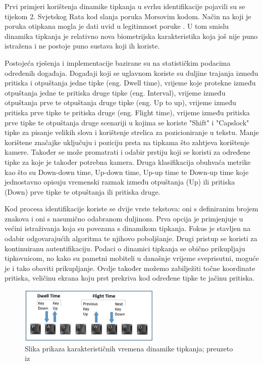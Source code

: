 \documentclass[]{foi}
\begin{document}
Prvi primjeri korištenja dinamike tipkanja u svrhu identifikacije pojavili su se tijekom 2. Svjetskog Rata kod slanja poruka Morsovim kodom. Način na koji je poruka otipkana mogla je dati uvid u legitimnost poruke \cite{Haring2007}. U tom smislu dinamika tipkanja je relativno nova biometrijska karakteristika koja još nije puno istražena i ne postoje puno sustava koji ih koriste. 

Postojeća rješenja i implementacije bazirane su na statističkim podacima određenih događaja. Događaji koji se uglavnom koriste su duljine trajanja između pritiska i otpuštanja jedne tipke (eng. Dwell time), vrijeme koje protekne između otpuštanja jedne te pritiska druge tipke (eng. Interval), vrijeme između otpuštanja prve te otpuštanja druge tipke (eng. Up to up), vrijeme između pritiska prve tipke te pritiska druge (eng. Flight time), vrijeme između pritiska prve tipke te otpuštanja druge scenariji u kojima se koriste "Shift" i "Capslock" tipke za pisanje velikih slova i korištenje strelica za pozicioniranje u tekstu.\cite{Kasprowski2022} Manje korištene značajke uključuju i poziciju prsta na tipkama što zahtjeva korištenje kamere. Također se može promatrati i odabir prstiju koji se koristi za određene tipke za koje je također potrebna kamera. Druga klasifikacija obuhvaća metrike kao što su Down-down time, Up-down time, Up-up time te Down-up time koje jednostavno opisuju vremenski razmak između otpuštanja (Up) ili pritiska (Down) prve tipke te otpuštanja ili pritiska druge.

Kod procesa identifikacije koriste se dvije vrste tekstova: oni s definiranim brojem znakova i oni s nasumično odabranom duljinom. Prva opcija je primjenjuje u većini istraživanja koja su povezana s dinamikom tipkanja. Fokus je stavljen na odabir odgovarajućih algoritma te njihovo poboljšanje. Drugi pristup se koristi za kontinuiranu autentifikaciju.\cite{Kasprowski2022} Podaci o dinamici tipkanja se obično prikupljaju tipkovnicom, no kako su pametni mobiteli u današnje vrijeme sveprisutni, moguće je i tako obaviti prikupljanje. Ovdje također možemo zabilježiti točne koordinate pritiska, veličinu ekrana koju prst prekriva kod određene tipke te jačinu pritiska.\cite{Lee2018}

\begin{figure}[!h]
    \centering
    \includegraphics[width=0.6\textwidth]{slike/karakteristike.jpeg}
    \caption{Slika prikaza karakterističnih vremena dinamike tipkanja; preuzeto iz \cite{Rootstrap}}
    \label{fig:slika-kar-vremena}
\end{figure}
\end{document}
